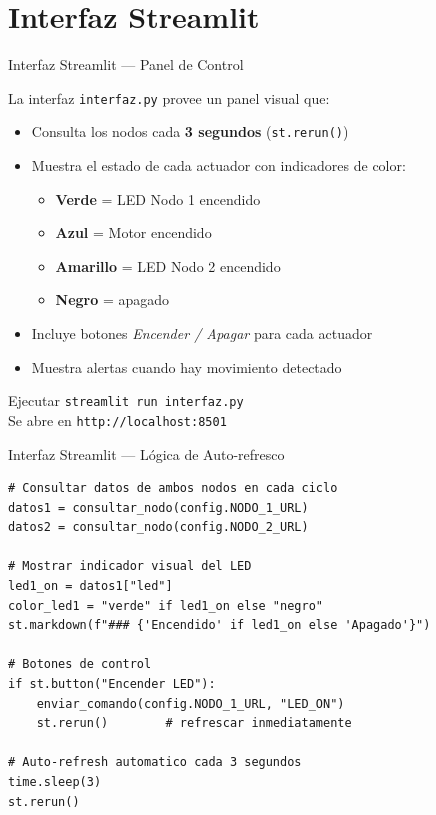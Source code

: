 \documentclass[aspectratio=169]{beamer}
\begin{document}
\section{Interfaz Streamlit}

\begin{frame}{Interfaz Streamlit --- Panel de Control}

La interfaz \texttt{interfaz.py} provee un panel visual que:

\begin{itemize}
  \item Consulta los nodos cada \textbf{3 segundos} (\texttt{st.rerun()})
  \item Muestra el estado de cada actuador con indicadores de color:
    \begin{itemize}
      \item \textcolor{green}{\textbullet} \textbf{Verde} = LED Nodo 1 encendido
      \item \textcolor{blue}{\textbullet} \textbf{Azul} = Motor encendido
      \item \textcolor{orange}{\textbullet} \textbf{Amarillo} = LED Nodo 2 encendido
      \item \textbullet{} \textbf{Negro} = apagado
    \end{itemize}
  \item Incluye botones \textit{Encender / Apagar} para cada actuador
  \item Muestra alertas cuando hay movimiento detectado
\end{itemize}

\vspace{0.5em}
\begin{block}{Ejecutar}
\texttt{streamlit run interfaz.py}\\
Se abre en \texttt{http://localhost:8501}
\end{block}
\end{frame}

\begin{frame}[fragile]{Interfaz Streamlit --- L\'ogica de Auto-refresco}

\begin{lstlisting}
# Consultar datos de ambos nodos en cada ciclo
datos1 = consultar_nodo(config.NODO_1_URL)
datos2 = consultar_nodo(config.NODO_2_URL)

# Mostrar indicador visual del LED
led1_on = datos1["led"]
color_led1 = "verde" if led1_on else "negro"
st.markdown(f"### {'Encendido' if led1_on else 'Apagado'}")

# Botones de control
if st.button("Encender LED"):
    enviar_comando(config.NODO_1_URL, "LED_ON")
    st.rerun()        # refrescar inmediatamente

# Auto-refresh automatico cada 3 segundos
time.sleep(3)
st.rerun()
\end{lstlisting}
\end{frame}
\end{document}
